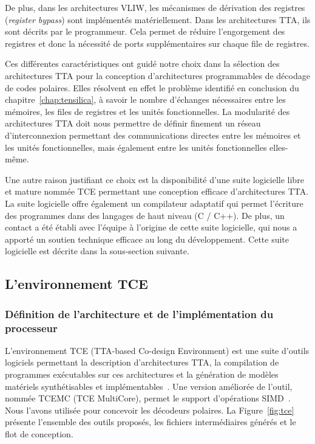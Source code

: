 De plus, dans les architectures VLIW, les mécanismes de dérivation des registres (\textit{register bypass}) sont implémentés matériellement. Dans les architectures TTA, ils sont décrits par le programmeur. Cela permet de réduire l'engorgement des registres et donc la nécessité de ports supplémentaires sur chaque file de registres.

Ces différentes caractéristiques ont guidé notre choix dans la sélection des architectures TTA pour la conception d'architectures programmables de décodage de codes polaires. Elles résolvent en effet le problème identifié en conclusion du chapitre~\ref{chap:tensilica}, à savoir le nombre d'échanges nécessaires entre les mémoires, les files de registres et les unités fonctionnelles. La modularité des architectures TTA doit nous permettre de définir finement un réseau d'interconnexion permettant des communications directes entre les mémoires et les unités fonctionnelles, mais également entre les unités fonctionnelles elles-même.

Une autre raison justifiant ce choix est la disponibilité d'une suite logicielle libre et mature nommée TCE permettant une conception efficace d'architectures TTA. La suite logicielle offre également un compilateur adaptatif qui permet l'écriture des programmes dans des langages de haut niveau (C / C++). De plus, un contact a été établi avec l'équipe à l'origine de cette suite logicielle, qui nous a apporté un soutien technique efficace au long du développement. Cette suite logicielle est décrite dans la sous-section suivante.


\subsection{L'environnement TCE}

\subsubsection{Définition de l'architecture et de l'implémentation du processeur}

L'environnement TCE (TTA-based Co-design Environment) est une suite d'outils logiciels permettant la description d'architectures TTA, la compilation de programmes exécutables sur ces architectures et la génération de modèles matériels synthétisables et implémentables~\cite{jaaskelainen_hw/sw_2017}. Une version améliorée de l'outil, nommée TCEMC (TCE MultiCore), permet le support d'opérations SIMD~\cite{tcemc_2011}. Nous l'avons utilisée pour concevoir les décodeurs polaires. La Figure~\ref{fig:tce} présente l'ensemble des outils proposés, les fichiers intermédiaires générés et le flot de conception.

